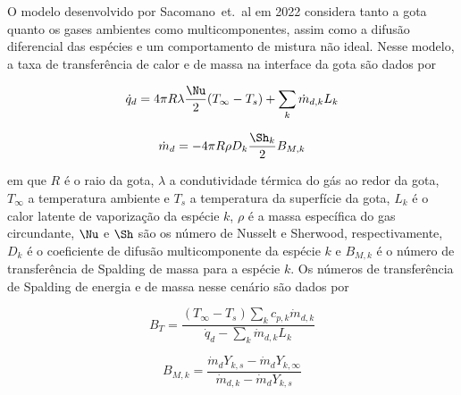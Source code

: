 O modelo desenvolvido por Sacomano~et.~al em 2022 \cite{SacomanoF2022IJHMT} considera tanto a gota quanto os gases ambientes como multicomponentes, assim como a difusão diferencial das espécies e um comportamento de mistura não ideal.
Nesse modelo, a taxa de transferência de calor e de massa na interface da gota são dados por 

\vspace{-24pt}
\begin{minipage}[t]{0.5\textwidth}
    \begin{equation}
        \dot q_d = 4\pi R \lambda \frac{\Nu}{2}(T_\infty - T_s) + \sum_k \dot m_{d,k} L_k \label{eq:dmd}
    \end{equation}
\end{minipage}
\hspace{20pt}
\begin{minipage}[t]{0.4\textwidth}
    \begin{equation}
        \dot m_d = -4 \pi R \rho D_k \frac{\Sh_k}{2}B_{M,k} \label{eq:dqd}
    \end{equation}
\end{minipage}
\vspace{12pt}

em que $R$ é o raio da gota, $\lambda$ a condutividade térmica do gás ao redor da gota, $T_\infty$ a temperatura ambiente e $T_s$ a temperatura da superfície da gota, $L_k$ é o calor latente de vaporização da espécie $k$, $\rho$ é a massa específica do gas circundante, $\Nu$ e $\Sh$ são os número de Nusselt e Sherwood, respectivamente, $D_k$ é o coeficiente de difusão multicomponente da espécie $k$ e $B_{M,k}$ é o número de transferência de Spalding de massa para a espécie $k$.
Os números de transferência de Spalding de energia e de massa nesse cenário são dados por

\vspace{12pt}
\begin{minipage}{0.45\linewidth}
    \begin{equation}
        B_T = \frac
            {(T_\infty - T_s) \sum_k c_{p,k}\dot m_{d,k}}
            {\dot q_d - \sum_k \dot m_{d,k} L_k} \label{eq:B_T}
    \end{equation}
\end{minipage}
\begin{minipage}{0.5\linewidth}
    \begin{equation}
        B_{M,k} = \frac
            {\dot m_d Y_{k,s} - \dot m_d Y_{k,\infty}}
            {\dot m_{d,k} - \dot m_d Y_{k,s}}\label{eq:B_Mk}
    \end{equation}
\end{minipage}
\vspace{12pt}

